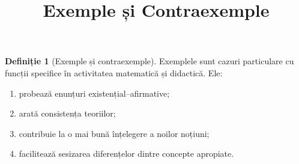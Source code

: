 \documentclass[12pt]{article}
\title{Exemple și Contraexemple}
\author{}
\date{}
\theoremstyle{definition}
\newtheorem{definition}{Definiție}
\begin{document}
\maketitle

\begin{definition}[Exemple și contraexemple]
Exemplele sunt cazuri particulare cu funcții specifice în activitatea matematică și didactică. Ele:
\begin{enumerate}
    \item probează enunțuri existențial–afirmative;
    \item arată consistența teoriilor;
    \item contribuie la o mai bună înțelegere a noilor noțiuni;
    \item facilitează sesizarea diferențelor dintre concepte apropiate.
\end{enumerate}
\end{definition}
\end{document}
